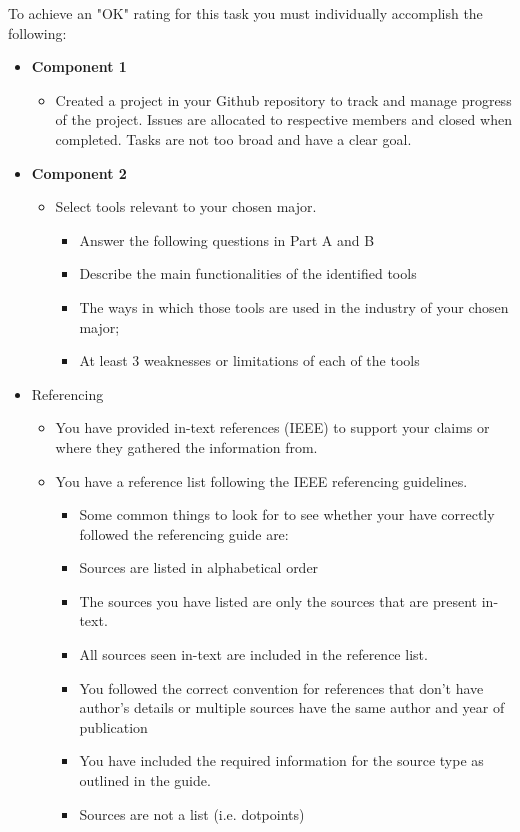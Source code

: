 \documentclass[a4paper, 11pt]{report}
\begin{document}
To achieve an "OK" rating for this task you must individually accomplish the following:
\begin{itemize}
\item \textbf{Component 1}
	\begin{itemize}
	\item Created a project in your Github repository to track and manage progress of the project. Issues are allocated to respective members and closed when completed. Tasks are not too broad and have a clear goal.
    \end{itemize}
		
\item \textbf{Component 2}
	\begin{itemize}
	\item Select tools relevant to your chosen major. 
        \begin{itemize}
            \item Answer the following questions in Part A and B
            \item Describe the main functionalities of the identified tools
            \item The ways in which those tools are used in the industry of your chosen major;
            \item At least 3 weaknesses or limitations of each of the tools
        \end{itemize}
    \end{itemize}
\item Referencing
	\begin {itemize}
	\item You have provided in-text references (IEEE) to support your claims or where they gathered the information from.
	\item You have a reference list following the IEEE referencing guidelines.
		\begin{itemize}
    		\item Some common things to look for to see whether your have correctly followed the referencing guide are:
    		\item Sources are listed in alphabetical order
    		\item The sources you have listed are only the sources that are present in-text.
    		\item All sources seen in-text are included in the reference list.
    		\item You followed the correct convention for references that don’t have author’s details or multiple sources have the same author and year of publication
    		\item You have included the required information for the source type as outlined in the guide.
    		\item Sources are not a list (i.e. dotpoints)
		\end{itemize}
	\end{itemize}
\end{itemize}
\end{document}
